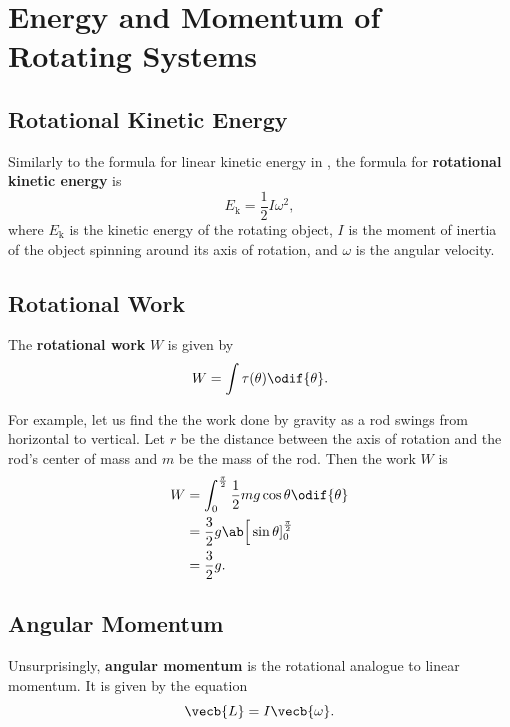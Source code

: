 \chapter{Energy and Momentum of Rotating Systems}


\section{Rotational Kinetic Energy}

Similarly to the formula for linear kinetic energy in
,
the formula for \textbf{rotational kinetic energy} is
\begin{equation}
    E_\mathrm{k} = \frac{1}{2} I \omega^2,
\end{equation}
where \(E_\mathrm{k}\) is the kinetic energy of the rotating object,
\(I\) is the moment of inertia of the object spinning around its axis
of rotation,
and \(\omega\) is the angular velocity.

\section{Rotational Work}

The \textbf{rotational work} \(W\) is given by
\begin{equation}
    W = \int \tau(\theta) \odif{\theta}.
\end{equation}

For example, let us find the the work done by gravity
as a rod swings from horizontal to vertical.
Let \(r\) be the distance between the axis of rotation and the rod's
center of mass
and \(m\) be the mass of the rod.
Then the work \(W\) is
\begin{equation}
    \begin{aligned}
        W &= \int_{0}^\frac{\pi}{2} \frac{1}{2} m g \cos\theta \odif{\theta} \\
        &= \frac{3}{2} g \ab\Big[\sin\theta]_0^\frac{\pi}{2} \\
        &= \frac{3}{2} g.
    \end{aligned}
\end{equation}

\section{Angular Momentum}

Unsurprisingly, \textbf{angular momentum} is the rotational analogue
to linear momentum.
It is given by the equation
\begin{equation}
    \vecb{L} = I \vecb{\omega}.
\end{equation}

